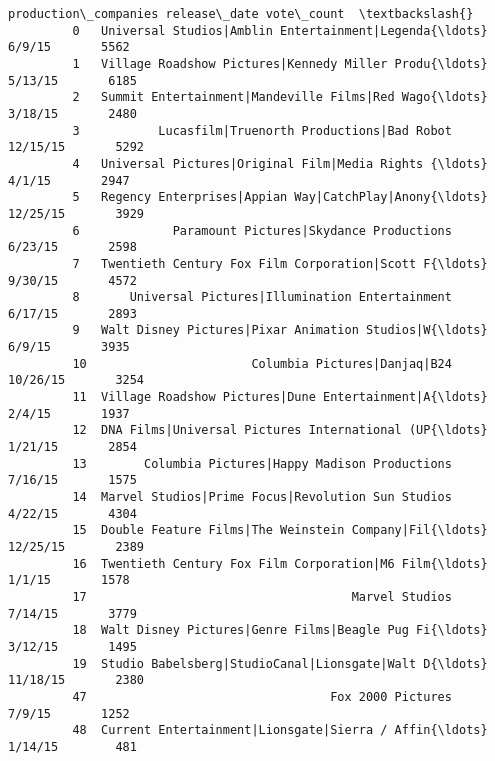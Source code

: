 \documentclass[11pt]{article}
\begin{document}
\begin{Verbatim}[commandchars=\\\{\}]
                                          production\_companies release\_date vote\_count  \textbackslash{}
         0   Universal Studios|Amblin Entertainment|Legenda{\ldots}       6/9/15       5562   
         1   Village Roadshow Pictures|Kennedy Miller Produ{\ldots}      5/13/15       6185   
         2   Summit Entertainment|Mandeville Films|Red Wago{\ldots}      3/18/15       2480   
         3           Lucasfilm|Truenorth Productions|Bad Robot     12/15/15       5292   
         4   Universal Pictures|Original Film|Media Rights {\ldots}       4/1/15       2947   
         5   Regency Enterprises|Appian Way|CatchPlay|Anony{\ldots}     12/25/15       3929   
         6             Paramount Pictures|Skydance Productions      6/23/15       2598   
         7   Twentieth Century Fox Film Corporation|Scott F{\ldots}      9/30/15       4572   
         8       Universal Pictures|Illumination Entertainment      6/17/15       2893   
         9   Walt Disney Pictures|Pixar Animation Studios|W{\ldots}       6/9/15       3935   
         10                       Columbia Pictures|Danjaq|B24     10/26/15       3254   
         11  Village Roadshow Pictures|Dune Entertainment|A{\ldots}       2/4/15       1937   
         12  DNA Films|Universal Pictures International (UP{\ldots}      1/21/15       2854   
         13        Columbia Pictures|Happy Madison Productions      7/16/15       1575   
         14  Marvel Studios|Prime Focus|Revolution Sun Studios      4/22/15       4304   
         15  Double Feature Films|The Weinstein Company|Fil{\ldots}     12/25/15       2389   
         16  Twentieth Century Fox Film Corporation|M6 Film{\ldots}       1/1/15       1578   
         17                                     Marvel Studios      7/14/15       3779   
         18  Walt Disney Pictures|Genre Films|Beagle Pug Fi{\ldots}      3/12/15       1495   
         19  Studio Babelsberg|StudioCanal|Lionsgate|Walt D{\ldots}     11/18/15       2380   
         47                                  Fox 2000 Pictures       7/9/15       1252   
         48  Current Entertainment|Lionsgate|Sierra / Affin{\ldots}      1/14/15        481   
         

\end{Verbatim}
\end{document}
